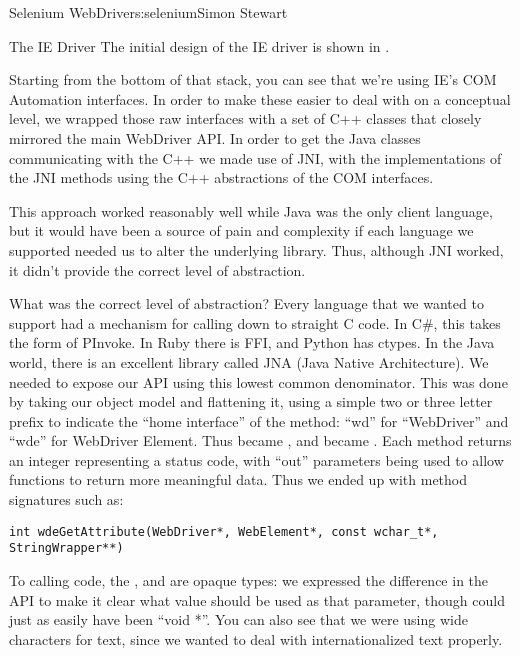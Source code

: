 \begin{aosachapter}{Selenium WebDriver}{s:selenium}{Simon Stewart}
\begin{aosasect1}{The IE Driver}
The initial design of the IE driver is shown in
.


Starting from the bottom of that stack, you can see that we're using
IE's COM Automation interfaces.  In order to make these easier to deal
with on a conceptual level, we wrapped those raw interfaces with a set
of C++ classes that closely mirrored the main WebDriver API\@. In order
to get the Java classes communicating with the C++ we made use of JNI,
with the implementations of the JNI methods using the C++ abstractions
of the COM interfaces.

This approach worked reasonably well while Java was the only client
language, but it would have been a source of pain and complexity if
each language we supported needed us to alter the underlying
library. Thus, although JNI worked, it didn't provide the correct
level of abstraction.

What was the correct level of abstraction? Every language that we
wanted to support had a mechanism for calling down to straight C
code. In C\#, this takes the form of PInvoke. In Ruby there is FFI, and
Python has ctypes. In the Java world, there is an excellent library
called JNA (Java Native Architecture). We needed to expose our API
using this lowest common denominator. This was done by taking our
object model and flattening it, using a simple two or three letter
prefix to indicate the ``home interface'' of the method: ``wd'' for
``WebDriver'' and ``wde'' for WebDriver Element. Thus
 became , and
 became . Each method
returns an integer representing a status code, with ``out'' parameters
being used to allow functions to return more meaningful data. Thus we
ended up with method signatures such as:

\begin{verbatim}
int wdeGetAttribute(WebDriver*, WebElement*, const wchar_t*, StringWrapper**)
\end{verbatim}

\noindent To calling code, the ,  and
 are opaque types: we expressed the difference in
the API to make it clear what value should be used as that parameter,
though could just as easily have been ``void *''. You can also see
that we were using wide characters for text, since we wanted to deal
with internationalized text properly.


\end{aosasect1}
\end{aosachapter}

